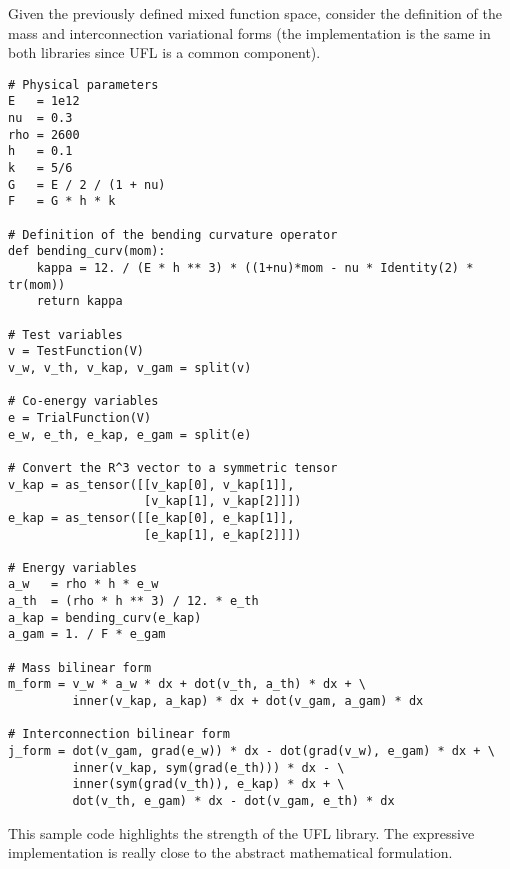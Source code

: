 Given the previously defined mixed function space, consider the definition of the mass and interconnection variational forms (the implementation is the same in both libraries since UFL is a common component).
 
\begin{tcolorbox}[title = Definition of the variational forms (\fenics \& \firedrake), coltitle=white, breakable, size=fbox, boxrule=1pt, pad at break*=1mm, enlarge top by=0.25em, enlarge bottom by=0.5em]
\begin{Verbatim}[tabsize=4]
# Physical parameters 
E   = 1e12
nu  = 0.3	
rho = 2600
h   = 0.1
k   = 5/6	
G   = E / 2 / (1 + nu)
F   = G * h * k

# Definition of the bending curvature operator
def bending_curv(mom):
	kappa = 12. / (E * h ** 3) * ((1+nu)*mom - nu * Identity(2) * tr(mom))
	return kappa
	
# Test variables
v = TestFunction(V)
v_w, v_th, v_kap, v_gam = split(v)	

# Co-energy variables
e = TrialFunction(V)
e_w, e_th, e_kap, e_gam = split(e)

# Convert the R^3 vector to a symmetric tensor
v_kap = as_tensor([[v_kap[0], v_kap[1]],
				   [v_kap[1], v_kap[2]]])
e_kap = as_tensor([[e_kap[0], e_kap[1]],
				   [e_kap[1], e_kap[2]]])
			
# Energy variables   
a_w   = rho * h * e_w
a_th  = (rho * h ** 3) / 12. * e_th
a_kap = bending_curv(e_kap)
a_gam = 1. / F * e_gam

# Mass bilinear form 
m_form = v_w * a_w * dx + dot(v_th, a_th) * dx + \
		 inner(v_kap, a_kap) * dx + dot(v_gam, a_gam) * dx 

# Interconnection bilinear form
j_form = dot(v_gam, grad(e_w)) * dx - dot(grad(v_w), e_gam) * dx + \
		 inner(v_kap, sym(grad(e_th))) * dx - \
		 inner(sym(grad(v_th)), e_kap) * dx + \
		 dot(v_th, e_gam) * dx - dot(v_gam, e_th) * dx
\end{Verbatim}
\end{tcolorbox}
This sample code highlights the strength of the UFL library. The expressive implementation is really close to the abstract mathematical formulation.

